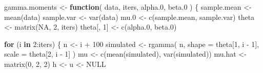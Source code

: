 \documentclass[9pt,twocolumn,twoside,]{pnas-new}
\newenvironment{Shaded}{}{}
\newcommand{\AttributeTok}[1]{\textcolor[rgb]{0.49,0.56,0.16}{#1}}
\newcommand{\ConstantTok}[1]{\textcolor[rgb]{0.53,0.00,0.00}{#1}}
\newcommand{\ControlFlowTok}[1]{\textcolor[rgb]{0.00,0.44,0.13}{\textbf{#1}}}
\newcommand{\DecValTok}[1]{\textcolor[rgb]{0.25,0.63,0.44}{#1}}
\newcommand{\FloatTok}[1]{\textcolor[rgb]{0.25,0.63,0.44}{#1}}
\newcommand{\FunctionTok}[1]{\textcolor[rgb]{0.02,0.16,0.49}{#1}}
\newcommand{\NormalTok}[1]{#1}
\newcommand{\OtherTok}[1]{\textcolor[rgb]{0.00,0.44,0.13}{#1}}
\newcommand{\SpecialCharTok}[1]{\textcolor[rgb]{0.25,0.44,0.63}{#1}}
\begin{document}
\begin{Shaded}
\begin{Highlighting}[]
\NormalTok{gamma.moments }\OtherTok{\textless{}{-}} \ControlFlowTok{function}\NormalTok{(}
\NormalTok{        data, iters, alpha}\FloatTok{.0}\NormalTok{, beta}\FloatTok{.0}
\NormalTok{) \{}
\NormalTok{  sample.mean }\OtherTok{\textless{}{-}} \FunctionTok{mean}\NormalTok{(data)}
\NormalTok{  sample.var }\OtherTok{\textless{}{-}} \FunctionTok{var}\NormalTok{(data)}
\NormalTok{  mu}\FloatTok{.0} \OtherTok{\textless{}{-}} \FunctionTok{c}\NormalTok{(sample.mean, sample.var)}
\NormalTok{  theta }\OtherTok{\textless{}{-}} \FunctionTok{matrix}\NormalTok{(}\ConstantTok{NA}\NormalTok{, }\DecValTok{2}\NormalTok{, iters)}
\NormalTok{  theta[, }\DecValTok{1}\NormalTok{] }\OtherTok{\textless{}{-}} \FunctionTok{c}\NormalTok{(alpha}\FloatTok{.0}\NormalTok{, beta}\FloatTok{.0}\NormalTok{)}

  \ControlFlowTok{for}\NormalTok{ (i }\ControlFlowTok{in} \DecValTok{2}\SpecialCharTok{:}\NormalTok{iters) \{}
\NormalTok{    n }\OtherTok{\textless{}{-}}\NormalTok{ i }\SpecialCharTok{+} \DecValTok{100}
\NormalTok{    simulated }\OtherTok{\textless{}{-}} \FunctionTok{rgamma}\NormalTok{(}
\NormalTok{            n,}
            \AttributeTok{shape =}\NormalTok{ theta[}\DecValTok{1}\NormalTok{, i }\SpecialCharTok{{-}} \DecValTok{1}\NormalTok{],}
            \AttributeTok{scale =}\NormalTok{ theta[}\DecValTok{2}\NormalTok{, i }\SpecialCharTok{{-}} \DecValTok{1}\NormalTok{]}
\NormalTok{    )}
\NormalTok{    mu }\OtherTok{\textless{}{-}} \FunctionTok{c}\NormalTok{(}\FunctionTok{mean}\NormalTok{(simulated), }\FunctionTok{var}\NormalTok{(simulated))}
\NormalTok{    mu.hat }\OtherTok{\textless{}{-}} \FunctionTok{matrix}\NormalTok{(}\DecValTok{0}\NormalTok{, }\DecValTok{2}\NormalTok{, }\DecValTok{2}\NormalTok{)}
\NormalTok{    h }\OtherTok{\textless{}{-}}\NormalTok{ u }\OtherTok{\textless{}{-}} \ConstantTok{NULL}


\end{Highlighting}
\end{Shaded}
\end{document}
